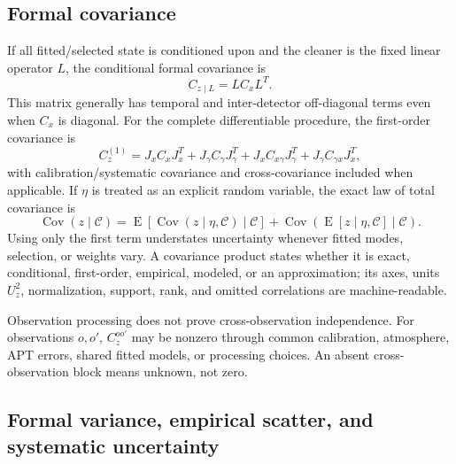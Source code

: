 \documentclass[11pt]{article}
\newcommand{\E}{\operatorname{E}}
\newcommand{\Cov}{\operatorname{Cov}}
\begin{document}
\subsection{Formal covariance}

If all fitted/selected state is conditioned upon and the cleaner is the fixed
linear operator $L$, the conditional formal covariance is
\begin{equation}
 C_{z\mid L}=L C_x L^T.
 \label{eq:conditional-covariance}
\end{equation}
This matrix generally has temporal and inter-detector off-diagonal terms even
when $C_x$ is diagonal.  For the complete differentiable procedure, the
first-order covariance is
\begin{equation}
 C_z^{(1)}=J_x C_x J_x^T
   +J_\gamma C_\gamma J_\gamma^T
   +J_x C_{x\gamma}J_\gamma^T
   +J_\gamma C_{\gamma x}J_x^T,
 \label{eq:delta-covariance}
\end{equation}
with calibration/systematic covariance and cross-covariance included when
applicable.  If $\eta$ is treated as an explicit random variable, the exact
law of total covariance is
\begin{equation}
 \Cov(z\mid\mathcal C)=
 \E\!\left[\Cov(z\mid\eta,\mathcal C)\mid\mathcal C\right]
 +\Cov\!\left(\E[z\mid\eta,\mathcal C]\mid\mathcal C\right).
 \label{eq:total-covariance}
\end{equation}
Using only the first term understates uncertainty whenever fitted modes,
selection, or weights vary.  A covariance product states whether it is exact,
conditional, first-order, empirical, modeled, or an approximation; its axes,
units $U_z^2$, normalization, support, rank, and omitted correlations are
machine-readable.

Observation processing does not prove cross-observation independence.  For
observations $o,o'$, $C_z^{oo'}$ may be nonzero through common calibration,
atmosphere, APT errors, shared fitted models, or processing choices.  An absent
cross-observation block means unknown, not zero.

\subsection{Formal variance, empirical scatter, and systematic uncertainty}
\end{document}
